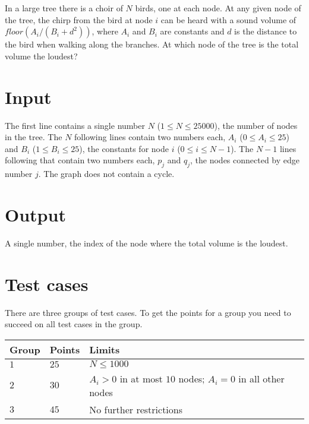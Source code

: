 In a large tree there is a choir of $N$ birds, one at each node. At any given node of the tree, the chirp from the bird at node $i$ can be heard with a sound volume of $floor(A_i / (B_i + d^2))$, where $A_i$ and $B_i$ are constants and $d$ is the distance to the bird when walking along the branches. At which node of the tree is the total volume the loudest?

\section*{Input}
The first line contains a single number $N$ ($1 \le N \le 25000$), the number of nodes in the tree. The $N$ following lines contain two numbers each, $A_i$ ($0 \le A_i \le 25$) and $B_i$ ($1 \le B_i \le 25$), the constants for node $i$ ($0 \le i \le N-1$). The $N-1$ lines following that contain two numbers each, $p_j$ and $q_j$, the nodes connected by edge number $j$. The graph does not contain a cycle.

\section*{Output}
A single number, the index of the node where the total volume is the loudest.

\section*{Test cases}
There are three groups of test cases. To get the points for a group you need to succeed on all test cases in the group.

\noindent
\begin{tabular}{| l | l | l |}
  \hline
  Group & Points & Limits                                                      \\ \hline
  $1$   & $25$   & $N \le 1000$                                                \\ \hline
  $2$   & $30$   & $A_i > 0$ in at most $10$ nodes; $A_i=0$ in all other nodes \\ \hline
  $3$   & $45$   & No further restrictions                                     \\ \hline
\end{tabular}

